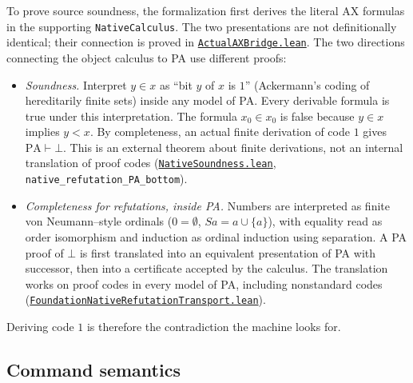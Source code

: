 \documentclass[11pt,letterpaper]{article}
\newcommand{\PA}{\mathrm{PA}}
\newcommand{\src}[2]{\href{https://github.com/jamesyc/BusyBeaver/blob/034d08df73b94e9f4036fc5af74b694eb73afc67/#1}{\texttt{\nolinkurl{#2}}}}
\newcommand{\repo}[1]{\texttt{\nolinkurl{#1}}}
\begin{document}
To prove source soundness, the formalization first derives the literal AX
formulas in the supporting \texttt{NativeCalculus}. The two presentations
are not definitionally identical; their connection is proved in
\src{Lean/metamathematics/PA215PA/ActualAXBridge.lean}{ActualAXBridge.lean}.
The two directions connecting the object calculus to PA use different proofs:
\begin{itemize}
\item \emph{Soundness.} Interpret $y\in x$ as ``bit $y$ of $x$ is $1$''
(Ackermann's coding of hereditarily finite sets) inside any model of PA.
Every derivable formula is true under this interpretation. The formula
$x_0\in x_0$ is false because $y\in x$ implies $y<x$. By completeness,
an actual finite derivation of code $1$ gives $\PA\vdash\bot$. This is an
external theorem about finite derivations, not an internal translation of
proof codes
(\src{Lean/metamathematics/PA215PA/NativeSoundness.lean}{NativeSoundness.lean},
\repo{native_refutation_PA_bottom}).
\item \emph{Completeness for refutations, inside PA.} Numbers are interpreted as
finite von Neumann--style ordinals ($0=\emptyset$, $S a=a\cup\{a\}$), with
equality read as order isomorphism and induction as ordinal induction
using separation. A PA proof of $\bot$ is first translated into an equivalent
presentation of PA with successor, then into a certificate accepted by
the calculus. The translation works on proof codes in every model of PA,
including nonstandard codes
(\src{Lean/metamathematics/PA215PA/FoundationNativeRefutationTransport.lean}{FoundationNativeRefutationTransport.lean}).
\end{itemize}
Deriving code $1$ is therefore the contradiction the machine looks for.

\subsection{Command semantics}
\end{document}
